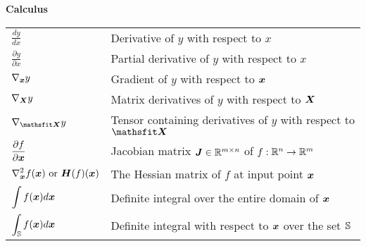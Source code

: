 \documentclass{article} %
\begin{document}
\centerline{\bf Calculus}
\bgroup
\def\arraystretch{1.5}
\begin{tabular}{p{1.25in}p{3.25in}}
   $\displaystyle\frac{d y} {d x}$                            & Derivative of $y$ with respect to $x$                                  \\ [2ex]
   $\displaystyle \frac{\partial y} {\partial x} $            & Partial derivative of $y$ with respect to $x$                          \\
   $\displaystyle \nabla_{\bm{x}} y $                              & Gradient of $y$ with respect to ${\bm{x}}$                                  \\
   $\displaystyle \nabla_{\bm{X}} y $                              & Matrix derivatives of $y$ with respect to ${\bm{X}}$                        \\
   $\displaystyle \nabla_\tX y $                              & Tensor containing derivatives of $y$ with respect to $\tX$             \\
   $\displaystyle \frac{\partial f}{\partial {\bm{x}}} $           & Jacobian matrix ${\bm{J}} \in \mathbb{R}^{m\times n}$ of $f: \mathbb{R}^n \rightarrow \mathbb{R}^m$ \\
   $\displaystyle \nabla_{\bm{x}}^2 f({\bm{x}})\text{ or }{\bm{H}}( f)({\bm{x}})$ & The Hessian matrix of $f$ at input point ${\bm{x}}$                         \\
   $\displaystyle \int f({\bm{x}}) d{\bm{x}} $                          & Definite integral over the entire domain of ${\bm{x}}$                      \\
   $\displaystyle \int_{\mathbb{S}} f({\bm{x}}) d{\bm{x}}$                       & Definite integral with respect to ${\bm{x}}$ over the set ${\mathbb{S}}$             \\
\end{tabular}
\egroup
\vspace{0.25cm}
\end{document}
